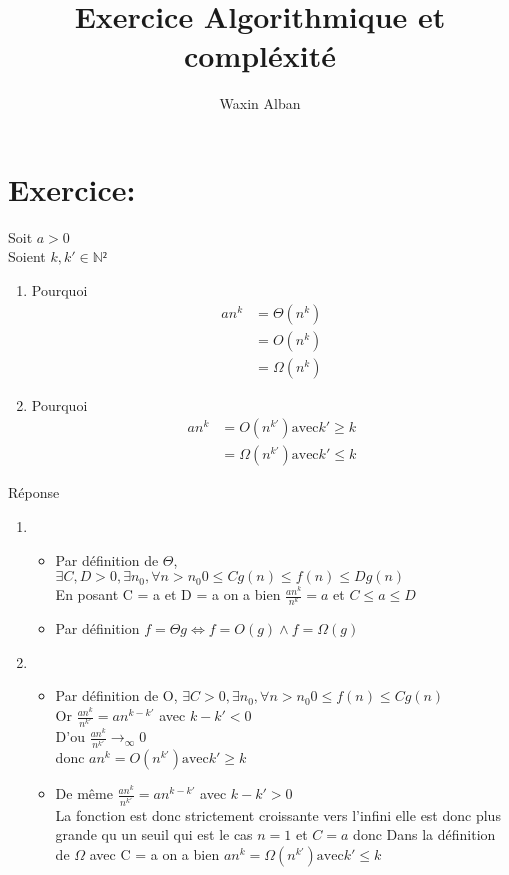 \documentclass[12pt]{report}
\title{Exercice Algorithmique et compléxité}
\author{Waxin Alban}
\newcommand{\N}{\mathbb{N}}
\begin{document}
\maketitle

\chapter*{Exercice:}

Soit $a > 0$\\
Soient $k,k' \in \N²$\\

\begin{enumerate}
\item Pourquoi \begin{align*}
a n^k &= \Theta(n^k)\\
&= O(n^k)\\
&= \Omega(n^k)
\end{align*}
\item Pourquoi \begin{align*}
an^k &=  O(n^{k'}) \text{avec} k' \geq k\\
&= \Omega(n^{k'}) \text{avec} k' \leq k
\end{align*}
\end{enumerate}
Réponse
\begin{enumerate}
\item \begin{itemize}
\item Par définition de $\Theta$, $\exists C,D > 0, \exists n_0, \forall n > n_0 0 \leq Cg(n) \leq f(n) \leq Dg(n)$\\
En posant C = a et D = a on a bien $\frac{a n^k}{n^k}  = a$ et $C \leq a \leq D$
\item Par définition $f= \Theta g \Leftrightarrow f = O(g) \wedge f = \Omega(g)$
\end{itemize} 
\item \begin{itemize}
\item Par définition de O, $\exists C > 0, \exists n_0, \forall n > n_0 0 \leq f(n) \leq Cg(n)$\\
Or $\frac{an^k}{n^{k'}} = an^{k-k'}$ avec $ k-k' < 0$\\
D'ou $\frac{an^k}{n^{k'}} \to_{\infty} 0$ \\
donc $an^k =  O(n^{k'}) \text{avec} k' \geq k$ 
\item  De même $\frac{an^k}{n^{k'}} = an^{k-k'}$ avec $ k-k' > 0$\\
La fonction est donc strictement croissante vers l'infini elle est donc plus grande qu un seuil qui est le cas $n=1$ et $C=a$ donc Dans la définition de $\Omega$ avec C = a on a bien $ an^k= \Omega(n^{k'}) \text{avec} k' \leq k$
\end{itemize}
\end{enumerate}
\end{document}
